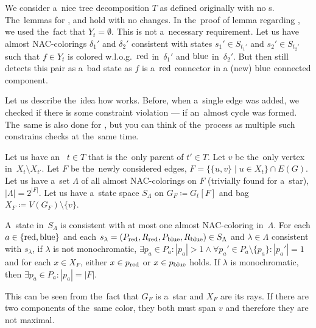 We consider a~nice tree decomposition \( T \) as defined originally
with no \IntroduceEdgeNode{}s.
The~lemmas for
\LeafNode{}, \RootNode{} and \ForgetVertexNode{} hold with no changes.
%
In the~proof of lemma 
regarding \JoinNode{},
we used the~fact that \( Y_t = \emptyset \).
This is not a~necessary requirement.
%
Let us have almost NAC-colorings \( \delta_1' \) and \( \delta_2' \)
consistent with states \( s_1' \in S_{t_1'} \) and \( s_2' \in S_{t_2'} \)
such that \( f \in Y_t \) is colored w.l.o.g.\ \( \text{red} \) in~\( \delta_1' \)
and \( \text{blue} \) in~\( \delta_2' \).
But then 
still detects this pair as a~bad state
as \( f \) is a~\( \text{red} \) connector in a (new) \( \text{blue} \) connected component.

Let us describe the~idea how \IntroduceVertexWithEdgesNode{} works.
Before, when a~single edge was added,
we checked if there is some constraint violation
--- if an~almost cycle was formed.
The~same is also done for \IntroduceVertexWithEdgesNode{},
but you can think of the~process as
multiple such constrains checks at the~same time.

Let us have an~\IntroduceVertexWithEdgesNode{} \( t \in T \) that
is the~only parent of \( t' \in T \).
Let \( v \) be the~only vertex in~\( X_t \setminus X_{t'} \).
Let \( F \) be the~newly considered edges,
\( F = \{ \{ u, v \} \mid u \in X_t \} \cap E(G) \).
%
Let us have a~set \( \Lambda \) of all almost NAC-colorings on \( F \)
(trivially found for a~star), \( |\Lambda| = 2^{|F|} \).
Let us have a~state space \( S_\Lambda \) on \( G_F \coloneqq G_t[F] \)
and bag \( X_F \coloneqq V(G_F) \setminus \{ v \} \).
%
\begin{observation}
	A~state in~\( S_\Lambda \) is consistent with at most one
	almost NAC-coloring in~\( \Lambda \).
	For each \( a \in \{\text{red}, \text{blue}\} \) and
	each \( s_\lambda = (P_{\text{red}}, R_{\text{red}}, P_{\text{blue}}, R_{\text{blue}}) \in S_\Lambda \)
	and \( \lambda \in \Lambda \) consistent with \( s_\lambda \),
	if \( \lambda \) is not monochromatic,
	\( \exists p_a \in P_a : |p_a| > 1
	\land \forall p_a' \in P_a \setminus \{p_a\} : |p_a'| = 1 \)
	and for each \( x \in X_F \), either \( x \in p_{\text{red}} \) or \( x \in p_{\text{blue}} \) holds.
	If \( \lambda \) is monochromatic, then \( \exists p_a \in P_a : |p_a| = |F| \).
\end{observation}
%
This can be seen from the~fact that \( G_F \) is a~star and \( X_F \) are its rays.
If there are two components of the~same color,
they both must span \( v \)
and therefore they are not maximal.

